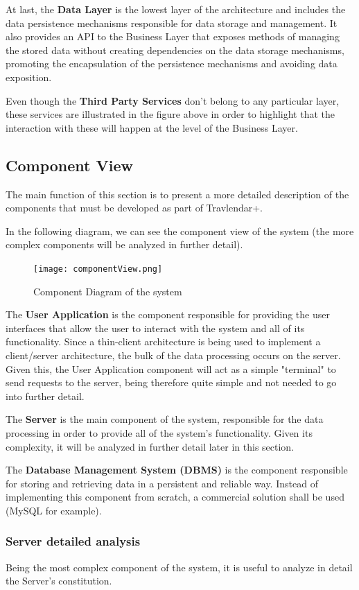 \documentclass[12pt]{article}
\begin{document}
At last, the \textbf{Data Layer} is the lowest layer of the architecture and includes the data persistence mechanisms responsible for data storage and management. It also provides an API to the Business Layer that exposes methods of managing the stored data without creating dependencies on the data storage mechanisms, promoting the encapsulation of the persistence mechanisms and avoiding data exposition. 

Even though the \textbf{Third Party Services} don't belong to any particular layer, these services are illustrated in the figure above in order to highlight that the interaction with these will happen at the level of the Business Layer.
\subsection{Component View}
The main function of this section is to present a more detailed description of the components that must be developed as part of Travlendar+.

In the following diagram, we can see the component view of the system (the more complex components will be analyzed in further detail).
\begin{figure}[H]
    \centering
    \texttt{[image: componentView.png]}
    \caption{Component Diagram of the system}
    \label{fig:componentView}
\end{figure}
The \textbf{User Application} is the component responsible for providing the user interfaces that allow the user to interact with the system and all of its functionality. Since a thin-client architecture is being used to implement a client/server architecture, the bulk of the data processing occurs on the server. Given this, the User Application component will act as a simple "terminal" to send requests to the server, being therefore quite simple and not needed to go into further detail. 

The \textbf{Server} is the main component of the system, responsible for the data processing in order to provide all of the system's functionality. Given its complexity, it will be analyzed in further detail later in this section.

The \textbf{Database Management System (DBMS)} is the component responsible for storing and retrieving data in a persistent and reliable way. Instead of implementing this component from scratch, a commercial solution shall be used (MySQL for example).

\subsubsection{Server detailed analysis}
Being the most complex component of the system, it is useful to analyze in detail the Server's constitution.
\end{document}
